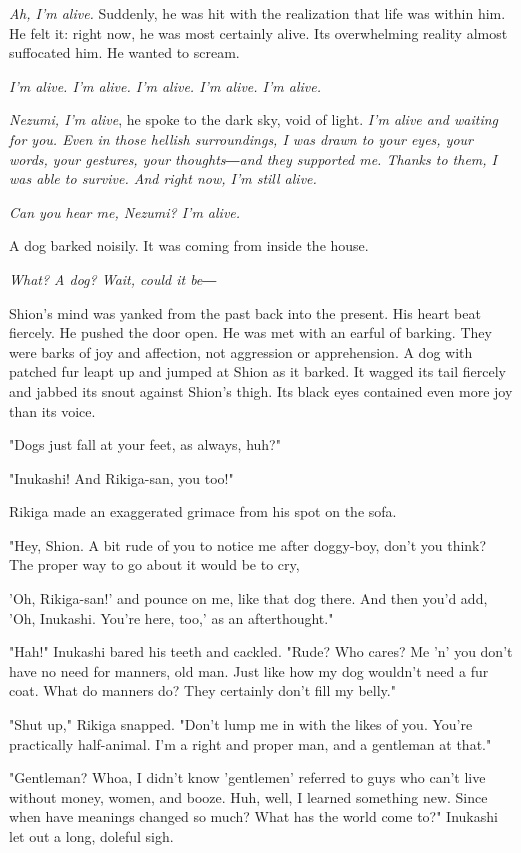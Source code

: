 \emph{Ah, I'm alive.} Suddenly, he was hit with the realization that life was
within him. He felt it: right now, he was most certainly alive. Its
overwhelming reality almost suffocated him. He wanted to scream.

\emph{I'm alive. I'm alive. I'm alive. I'm alive. I'm alive.}

\emph{Nezumi, I'm alive}, he spoke to the dark sky, void of light. \emph{I'm alive
and waiting for you. Even in those hellish surroundings, I was drawn to
your eyes, your words, your gestures, your thoughts―and they supported
me. Thanks to them, I was able to survive. And right now, I'm still
alive.}

\emph{Can you hear me, Nezumi? I'm alive.}

A dog barked noisily. It was coming from inside the house.

\emph{What? A dog? Wait, could it be―}

Shion's mind was yanked from the past back into the present. His heart
beat fiercely. He pushed the door open. He was met with an earful of
barking. They were barks of joy and affection, not aggression or
apprehension. A dog with patched fur leapt up and jumped at Shion as it
barked. It wagged its tail fiercely and jabbed its snout against Shion's
thigh. Its black eyes contained even more joy than its voice.

"Dogs just fall at your feet, as always, huh?"

"Inukashi! And Rikiga-san, you too!"

Rikiga made an exaggerated grimace from his spot on the sofa.~

"Hey, Shion. A bit rude of you to notice me after doggy-boy, don't you
think? The proper way to go about it would be to cry,~

'Oh, Rikiga-san!' and pounce on me, like that dog there. And then you'd
add, 'Oh, Inukashi. You're here, too,' as an afterthought."

"Hah!" Inukashi bared his teeth and cackled. "Rude? Who cares? Me 'n'
you don't have no need for manners, old man. Just like how my dog
wouldn't need a fur coat. What do manners do? They certainly don't fill
my belly."

"Shut up," Rikiga snapped. "Don't lump me in with the likes of you.
You're practically half-animal. I'm a right and proper man, and a
gentleman at that."

"Gentleman? Whoa, I didn't know 'gentlemen' referred to guys who can't
live without money, women, and booze. Huh, well, I learned something
new. Since when have meanings changed so much? What has the world come
to?" Inukashi let out a long, doleful sigh.

